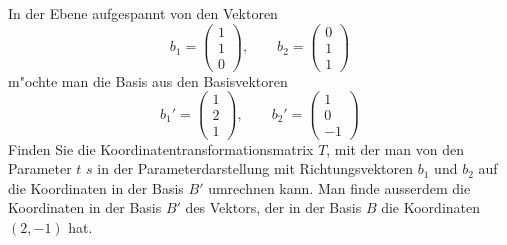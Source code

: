 \begin{beispiel}
In der Ebene aufgespannt von den Vektoren 
\[
b_1=\begin{pmatrix}1\\1\\0 \end{pmatrix}
,\qquad
b_2=\begin{pmatrix}0\\1\\1 \end{pmatrix}
\]
m"ochte man die Basis aus den Basisvektoren
\[
b_1'=\begin{pmatrix}1\\2\\1\end{pmatrix}
,\qquad
b_2'=\begin{pmatrix}1\\0\\-1\end{pmatrix}
\]
Finden Sie die Koordinatentransformationsmatrix $T$, mit der
man von den Parameter $t$ $s$ in der Parameterdarstellung
mit Richtungsvektoren $b_1$ und $b_2$ auf die Koordinaten in
der Basis $B'$ umrechnen kann.
Man finde ausserdem die 
Koordinaten in der Basis $B'$ des Vektors, der in der Basis $B$
die Koordinaten $(2,-1)$ hat.


\end{beispiel}
